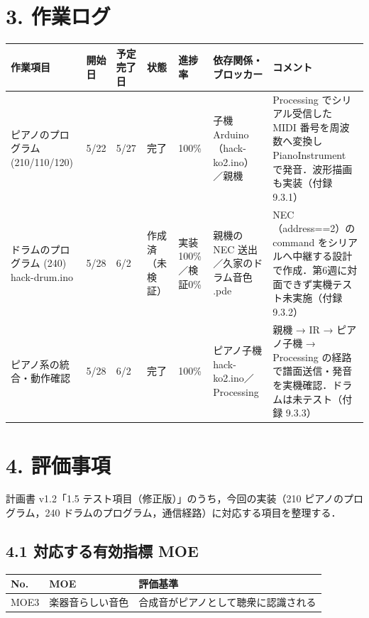 \documentclass[a4paper,11pt]{ltjsarticle}
\providecommand{\％}{\%}
\begin{document}
\section{3. 作業ログ}

\renewcommand{\arraystretch}{1.4}

\begin{longtable}{|p{2.6cm}|p{1.4cm}|p{1.6cm}|p{1.4cm}|p{1cm}|p{2.4cm}|p{3.0cm}|}
\hline
\rowcolor[gray]{0.9}
作業項目 & 開始日 & 予定完了日 & 状態 & 進捗率 & 依存関係・ブロッカー & コメント \\
\hline
ピアノのプログラム (210/110/120) & 5/22 & 5/27 & 完了 & 100\％ & 子機 Arduino（hack-ko2.ino）／親機 & Processing でシリアル受信した MIDI 番号を周波数へ変換し PianoInstrument で発音．波形描画も実装（付録 9.3.1） \\
\hline
ドラムのプログラム (240) hack-drum.ino & 5/28 & 6/2 & 作成済（未検証） & 実装100\％／検証0\％ & 親機の NEC 送出／久家のドラム音色 .pde & NEC（address==2）の command をシリアルへ中継する設計で作成．第6週に対面できず実機テスト未実施（付録 9.3.2） \\
\hline
ピアノ系の統合・動作確認 & 5/28 & 6/2 & 完了 & 100\％ & ピアノ子機 hack-ko2.ino／Processing & 親機 → IR → ピアノ子機 → Processing の経路で譜面送信・発音を実機確認．ドラムは未テスト（付録 9.3.3） \\
\hline
\end{longtable}

\section{4. 評価事項}

計画書 v1.2「1.5 テスト項目（修正版）」のうち，今回の実装（210 ピアノのプログラム，240 ドラムのプログラム，通信経路）に対応する項目を整理する．

\subsection*{4.1 対応する有効指標 MOE}

\begin{longtable}{|p{1.2cm}|p{4cm}|p{8cm}|}
\hline
\rowcolor[gray]{0.9}
No. & MOE & 評価基準 \\
\hline
MOE3 & 楽器音らしい音色 & 合成音がピアノとして聴衆に認識される \\
\hline
\end{longtable}
\end{document}
